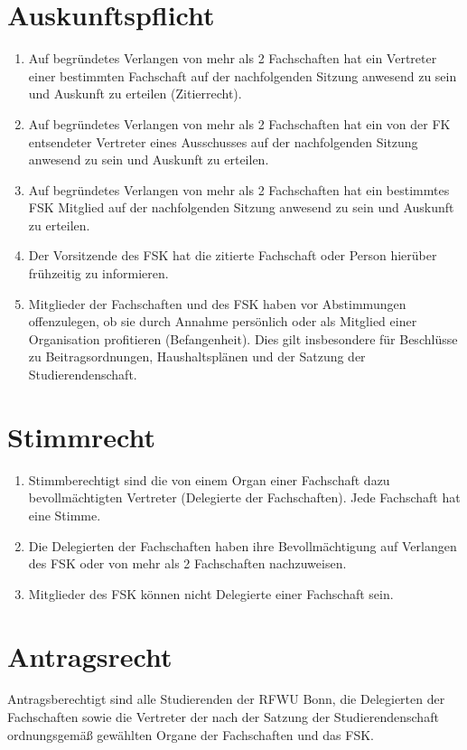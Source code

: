 \documentclass{article}
\begin{document}
\section{Auskunftspflicht}
\begin{enumerate}[(1)]
    \item Auf begründetes Verlangen von mehr als 2 Fachschaften hat ein Vertreter einer bestimmten Fachschaft auf der nachfolgenden Sitzung anwesend zu sein und Auskunft zu erteilen (Zitierrecht).
    \item Auf begründetes Verlangen von mehr als 2 Fachschaften hat ein von der FK entsendeter Vertreter eines Ausschusses auf der nachfolgenden Sitzung anwesend zu sein und Auskunft zu erteilen.
    \item Auf begründetes Verlangen von mehr als 2 Fachschaften hat ein bestimmtes FSK Mitglied auf der nachfolgenden Sitzung anwesend zu sein und Auskunft zu erteilen.
    \item Der Vorsitzende des FSK hat die zitierte Fachschaft oder Person hierüber frühzeitig zu informieren. 
    \item Mitglieder der Fachschaften und des FSK haben vor Abstimmungen offenzulegen, ob sie durch Annahme persönlich oder als Mitglied einer Organisation profitieren (Befangenheit). Dies gilt insbesondere für Beschlüsse zu Beitragsordnungen, Haushaltsplänen und der Satzung der Studierendenschaft.
\end{enumerate}

\section{Stimmrecht}
\begin{enumerate}[(1)]
    \item Stimmberechtigt sind die von einem Organ einer Fachschaft dazu bevollmächtigten Vertreter (Delegierte der Fachschaften). 
    	Jede Fachschaft hat eine Stimme.
    \item Die Delegierten der Fachschaften haben ihre Bevollmächtigung auf Verlangen des FSK oder von mehr als 2 Fachschaften nachzuweisen.
    \item Mitglieder des FSK können nicht Delegierte einer Fachschaft sein.
\end{enumerate}

\section{Antragsrecht}
Antragsberechtigt sind alle Studierenden der RFWU Bonn, die Delegierten der Fachschaften sowie die Vertreter der nach der Satzung der Studierendenschaft ordnungsgemäß gewählten Organe der Fachschaften und das FSK.
\end{document}
